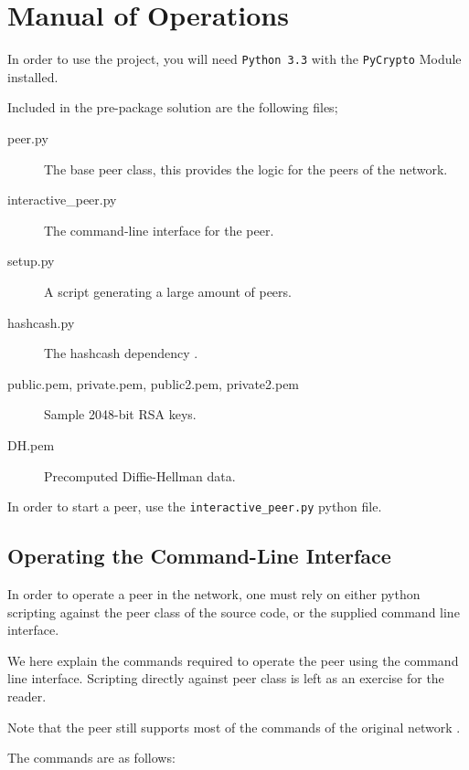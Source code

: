 \section{Manual of Operations}

In order to use the project, you will need \texttt{Python 3.3} with the \texttt{PyCrypto} Module installed.

Included in the pre-package solution are the following files;
\begin{description}
\item[peer.py] The base peer class, this provides the logic for the peers of the network.
\item[interactive\_peer.py] The command-line interface for the peer.
\item[setup.py] A script generating a large amount of peers.
\item[hashcash.py] The hashcash dependency \citep{HashCash}.
\item[public.pem, private.pem, public2.pem, private2.pem] Sample 2048-bit RSA keys.
\item[DH.pem] Precomputed Diffie-Hellman data. 
\end{description}

In order to start a peer, use the \texttt{interactive\_peer.py} python file.



\subsection{Operating the Command-Line Interface}
In order to operate a peer in the network, one must rely on either python scripting against the peer class of the source code, or the supplied command line interface.

We here explain the commands required to operate the peer using the command line interface. Scripting directly against peer class is left as an exercise for the reader.

Note that the peer still supports most of the commands of the original network \citep{P2PN}.

The commands are as follows:

